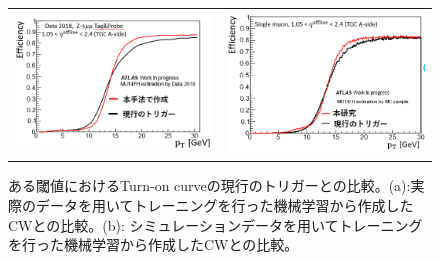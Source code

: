 \begin{figure}
    \begin{tabular}{cc}
    \begin{minipage}[b]{0.45\hsize}
        \includegraphics[clip, width=7cm]{fig/4/hikaku_v05_v06.png}
        \subcaption{}
        \label{fig:v05v06}
    \end{minipage}&
    \begin{minipage}[b]{0.45\hsize}
        \includegraphics[clip, width=7cm]{fig/4/hikaku_v05_v07.png}
        \subcaption{}
        \label{fig:v05v07}
    \end{minipage}
    \end{tabular}
    \caption{ある閾値におけるTurn-on curveの現行のトリガーとの比較。(a):実際のデータを用いてトレーニングを行った機械学習から作成したCWとの比較。(b): シミュレーションデータを用いてトレーニングを行った機械学習から作成したCWとの比較。}
    \label{}
\end{figure}

